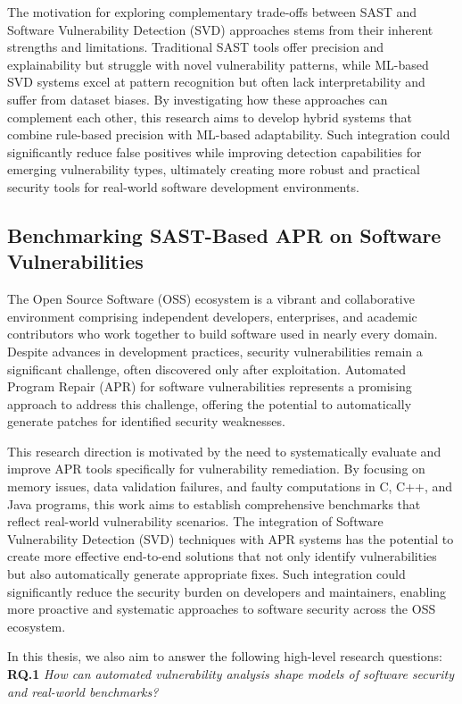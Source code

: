 The motivation for exploring complementary trade-offs between SAST and Software Vulnerability Detection (SVD) approaches stems from their inherent strengths and limitations. Traditional SAST tools offer precision and explainability but struggle with novel vulnerability patterns, while ML-based SVD systems excel at pattern recognition but often lack interpretability and suffer from dataset biases. By investigating how these approaches can complement each other, this research aims to develop hybrid systems that combine rule-based precision with ML-based adaptability. Such integration could significantly reduce false positives while improving detection capabilities for emerging vulnerability types, ultimately creating more robust and practical security tools for real-world software development environments.

\subsection*{Benchmarking SAST-Based APR on Software Vulnerabilities}

The Open Source Software (OSS) ecosystem is a vibrant and collaborative environment comprising independent developers, enterprises, and academic contributors who work together to build software used in nearly every domain. Despite advances in development practices, security vulnerabilities remain a significant challenge, often discovered only after exploitation. Automated Program Repair (APR) for software vulnerabilities represents a promising approach to address this challenge, offering the potential to automatically generate patches for identified security weaknesses.

This research direction is motivated by the need to systematically evaluate and improve APR tools specifically for vulnerability remediation. By focusing on memory issues, data validation failures, and faulty computations in C, C++, and Java programs, this work aims to establish comprehensive benchmarks that reflect real-world vulnerability scenarios. The integration of Software Vulnerability Detection (SVD) techniques with APR systems has the potential to create more effective end-to-end solutions that not only identify vulnerabilities but also automatically generate appropriate fixes. Such integration could significantly reduce the security burden on developers and maintainers, enabling more proactive and systematic approaches to software security across the OSS ecosystem.

In this thesis, we also aim to answer the following high-level research questions:
\newline
\noindent
\textbf{\footnotesize RQ.1} \textit{How can automated vulnerability analysis shape models of software security and real-world benchmarks?}

